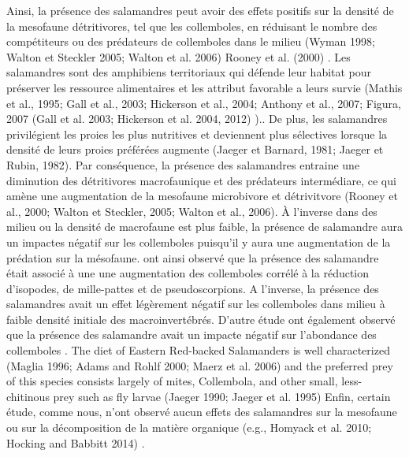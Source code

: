 Ainsi, la présence des salamandres peut avoir des effets positifs sur la densité de la mesofaune détritivores, tel que les collemboles, 
en réduisant le nombre des compétiteurs ou des prédateurs de collemboles dans le milieu (Wyman 1998; Walton et Steckler 2005; Walton et al. 2006)  Rooney et al. (2000) \citep{Wyman1998Experimentalassessment}. 
Les salamandres sont des amphibiens territoriaux qui défende leur habitat pour préserver les ressource alimentaires et les attribut favorable a leurs survie (Mathis et al., 1995; Gall et al., 2003; Hickerson et al., 2004; Anthony et al., 2007; Figura, 2007 (Gall et al. 2003; Hickerson et al. 2004, 2012) ).. 
De plus, les salamandres privilégient les proies les plus nutritives et deviennent plus sélectives lorsque la densité de leurs proies préférées augmente (Jaeger et Barnard, 1981; Jaeger et Rubin, 1982). 
Par conséquence, la présence des salamandres entraine une diminution des détritivores macrofaunique et des prédateurs intermédiare, ce qui amène une augmentation de la mesofaune microbivore et détrivitvore (Rooney et al., 2000; Walton et Steckler, 2005; Walton et al., 2006). 
À l'inverse dans des milieu ou la densité de macrofaune est plus faible, la présence de salamandre aura un impactes négatif sur les collemboles puisqu'il y aura une augmentation de la prédation sur la mésofaune.
\cite{Walton2006Salamandersforestfloora} ont ainsi observé que la présence des salamandre était associé à une une augmentation des collemboles corrélé à la réduction d'isopodes, de mille-pattes et de pseudoscorpions.  
A l'inverse, la présence des salamandres avait un effet légèrement négatif sur les collemboles dans milieu à faible densité initiale des macroinvertébrés.
D'autre étude ont également observé que la présence des salamandre avait un impacte négatif sur l'abondance des collemboles \citep{Hickerson2017Easternredbacked}.
The diet of Eastern Red-backed Salamanders is well characterized (Maglia 1996; Adams and Rohlf 2000; Maerz et al. 2006) 
and the preferred prey of this species consists largely of mites, Collembola, and other small, less-chitinous prey such as fly larvae (Jaeger 1990; Jaeger et al. 1995)
Enfin, certain étude, comme nous, n'ont observé aucun effets des salamandres sur la mesofaune ou sur la décomposition de la matière organique (e.g., Homyack et al. 2010; Hocking and Babbitt 2014) \citep{Hocking2013Effectsexperimental,Hocking2014Effectsredbacked,Hickerson2017Easternredbacked}.


